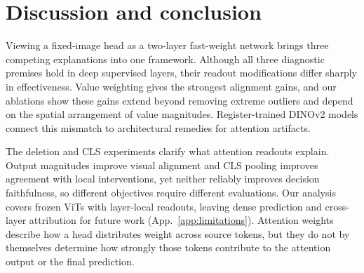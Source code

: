 \documentclass{article}
\begin{document}
\section{Discussion and conclusion}
Viewing a fixed-image head as a two-layer fast-weight network brings three competing explanations into one framework. Although all three diagnostic premises hold in deep supervised layers, their readout modifications differ sharply in effectiveness. Value weighting gives the strongest alignment gains, and our ablations show these gains extend beyond removing extreme outliers and depend on the spatial arrangement of value magnitudes. Register-trained DINOv2 models connect this mismatch to architectural remedies for attention artifacts.

The deletion and CLS experiments clarify what attention readouts explain. Output magnitudes improve visual alignment and CLS pooling improves agreement with local interventions, yet neither reliably improves decision faithfulness, so different objectives require different evaluations. Our analysis covers frozen ViTs with layer-local readouts, leaving dense prediction and cross-layer attribution for future work (App.~\ref{app:limitations}). Attention weights describe how a head distributes weight across source tokens, but they do not by themselves determine how strongly those tokens contribute to the attention output or the final prediction.

\label{main:end}
\clearpage
{\footnotesize\setlength{\bibsep}{0.6pt}}
\clearpage\appendix

\end{document}
